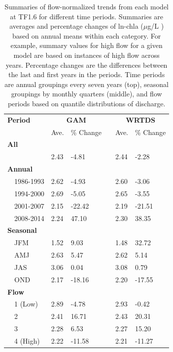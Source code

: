 \documentclass[letterpaper,12pt,oneside]{article}\usepackage[]{graphicx}\usepackage[]{color}
\newcommand{\mugl}{$\mu$g/L }
\begin{document}
\begin{table}[!tbp]
\caption{Summaries of flow-normalized trends from each model at TF1.6 for different time periods.  Summaries are averages and percentage changes of ln-\ac{chla} (\mugl) based on annual means within each category.  For example, summary values for high flow for a given model are based on instances of high flow across years.  Percentage changes are the differences between the last and first years in the periods.  Time periods are annual groupings every seven years (top), seasonal groupings by monthly quarters (middle), and flow periods based on quantile distributions of discharge.\label{tab:trendsTF16}} 
\begin{center}
\begin{tabular}{lllcll}
\hline\hline
\multicolumn{1}{l}{\bfseries Period}&\multicolumn{2}{c}{\bfseries GAM}&\multicolumn{1}{c}{\bfseries }&\multicolumn{2}{c}{\bfseries WRTDS}\tabularnewline
\cline{2-3} \cline{5-6}
\multicolumn{1}{l}{}&\multicolumn{1}{c}{Ave.}&\multicolumn{1}{c}{\% Change}&\multicolumn{1}{c}{}&\multicolumn{1}{c}{Ave.}&\multicolumn{1}{c}{\% Change}\tabularnewline
\hline
{\bfseries All}&&&&&\tabularnewline
~~&2.43& -4.81&&2.44& -2.28\tabularnewline
\hline
{\bfseries Annual}&&&&&\tabularnewline
~~1986-1993&2.62& -4.93&&2.60& -3.06\tabularnewline
~~1994-2000&2.69& -5.05&&2.65& -3.55\tabularnewline
~~2001-2007&2.15&-22.42&&2.19&-21.51\tabularnewline
~~2008-2014&2.24& 47.10&&2.30& 38.35\tabularnewline
\hline
{\bfseries Seasonal}&&&&&\tabularnewline
~~JFM&1.52&  9.03&&1.48& 32.72\tabularnewline
~~AMJ&2.63&  5.47&&2.62&  5.14\tabularnewline
~~JAS&3.06&  0.04&&3.08&  0.79\tabularnewline
~~OND&2.17&-18.16&&2.20&-17.55\tabularnewline
\hline
{\bfseries Flow}&&&&&\tabularnewline
~~1 (Low)&2.89& -4.78&&2.93& -0.42\tabularnewline
~~2&2.41& 16.71&&2.43& 20.31\tabularnewline
~~3&2.28&  6.53&&2.27& 15.20\tabularnewline
~~4 (High)&2.22&-11.58&&2.21&-11.27\tabularnewline
\hline
\end{tabular}\end{center}

\end{table}
\end{document}
